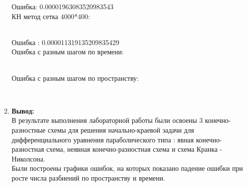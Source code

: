 \documentclass[12pt]{article}
\begin{document}
\begin{enumerate}
        Ошибка: 0.00001963083520983543
        \newpage
        \\КН метод сетка 4000*400: 
        \begin{figure}[h]
            \label{ris:image}
        \end{figure}\\
        
        Ошибка : 0.000011319135209835429
        \\  Ошибка с разным шагом по времени:
        \begin{figure}[h]
            \label{ris:image}
        \end{figure}\\

        Ошибка с разным шагом по пространству:
        \begin{figure}[h]
            \label{ris:image}
        \end{figure}\\
\newpage

        \item \textbf{Вывод:}\\
        В результате выполнения лабораторной работы были освоены 3 конечно-разностные схемы для решения начально-краевой задачи для дифференциального уравнения параболического типа : явная конечно-разностная схема, неявная конечно-разностная схема и схема Кранка - Николсона.
\\Были построены графики ошибок, на которых показано падение ошибки при росте числа разбиений по пространству и времени.

        
    \end{enumerate}
\end{document}
